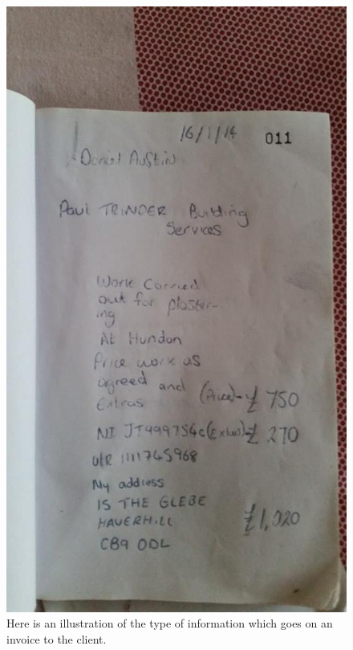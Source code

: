 \begin{figure}[H]
    \includegraphics[width=\textwidth]{./Analysis/images/invoice2.jpg}
    \caption{Here is an illustration of the type of information which goes on an invoice to the client.} \label{fig:invoice}
\end{figure}


